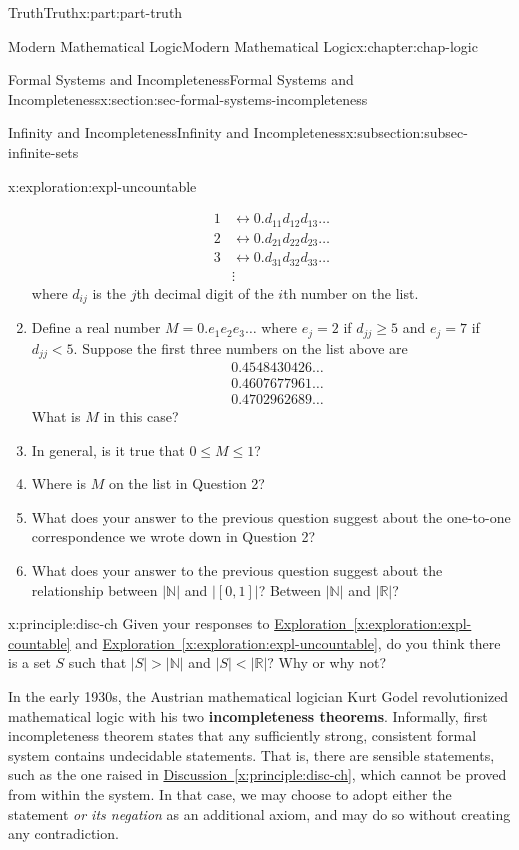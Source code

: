 \documentclass[oneside,10pt,]{book}
\newcommand{\xreffont}{\relax}
\newcommand{\terminology}[1]{\textbf{#1}}
\numberwithin{equation}{section}
\renewcommand{\le}{\leqslant}
\renewcommand{\ge}{\geqslant}
\newcommand{\lt}{<}
\newcommand{\gt}{>}
\newcommand{\amp}{&}
\begin{document}
\begin{partptx}{Truth}{}{Truth}{}{}{x:part:part-truth}
\begin{chapterptx}{Modern Mathematical Logic}{}{Modern Mathematical Logic}{}{}{x:chapter:chap-logic}
\begin{sectionptx}{Formal Systems and Incompleteness}{}{Formal Systems and Incompleteness}{}{}{x:section:sec-formal-systems-incompleteness}
\begin{subsectionptx}{Infinity and Incompleteness}{}{Infinity and Incompleteness}{}{}{x:subsection:subsec-infinite-sets}
\begin{exploration}{}{x:exploration:expl-uncountable}
\begin{enumerate}
\begin{align*}
1 \amp \leftrightarrow 0.d_{11}d_{12}d_{13}\ldots\\
2 \amp \leftrightarrow 0.d_{21}d_{22}d_{23}\ldots\\
3 \amp \leftrightarrow 0.d_{31}d_{32}d_{33}\ldots\\
\amp \vdots 
\end{align*}
where \(d_{ij}\) is the \(j\)th decimal digit of the \(i\)th number on the list.%
\item{}Define a real number \(M = 0.e_1 e_2 e_3 \ldots\) where \(e_j = 2\) if \(d_{jj} \ge 5\) and \(e_j = 7\) if \(d_{jj} \lt 5\). Suppose the first three numbers on the list above are%
\begin{align*}
\amp 0.4548430426\ldots\\
\amp 0.4607677961\ldots\\
\amp 0.4702962689\ldots
\end{align*}
What is \(M\) in this case?%
\item{}In general, is it true that \(0 \le M \le 1\)?%
\item{}Where is \(M\) on the list in Question 2?%
\item{}What does your answer to the previous question suggest about the one-to-one correspondence we wrote down in Question 2?%
\item{}What does your answer to the previous question suggest about the relationship between \(|\mathbb{N}|\) and \(|[0,1]|\)? Between \(|\mathbb{N}|\) and \(|\mathbb{R}|\)?%
\end{enumerate}
\end{exploration}%
\begin{principle}{}{}{x:principle:disc-ch}%
Given your responses to \hyperref[x:exploration:expl-countable]{Exploration~{\xreffont\ref{x:exploration:expl-countable}}} and \hyperref[x:exploration:expl-uncountable]{Exploration~{\xreffont\ref{x:exploration:expl-uncountable}}}, do you think there is a set \(S\) such that \(|S| \gt |\mathbb{N}|\) and \(|S| \lt |\mathbb{R}|\)? Why or why not?%
\end{principle}
 In the early 1930s, the Austrian mathematical logician Kurt Godel revolutionized mathematical logic with his two \terminology{incompleteness theorems}. Informally, first incompleteness theorem states that any sufficiently strong, consistent formal system contains undecidable statements. That is, there are sensible statements, such as the one raised in \hyperref[x:principle:disc-ch]{Discussion~{\xreffont\ref{x:principle:disc-ch}}}, which cannot be proved from within the system. In that case, we may choose to adopt either the statement \emph{or its negation} as an additional axiom, and may do so without creating any contradiction.%

\end{subsectionptx}
\end{sectionptx}
\end{chapterptx}
\end{partptx}
\end{document}
